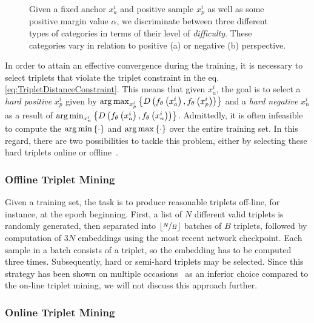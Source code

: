 \begin{figure}[t]
\begin{subfigure}[b]{0.35\textwidth}
        \caption[]{}
    \end{subfigure}
    \caption[Triplet loss categories visualization]{Given a fixed anchor $x_a^i$ and positive sample $x_p^i$ as well as some positive margin value $\alpha$, we discriminate between three different types of categories in terms of their level of \emph{difficulty}. These categories vary in relation to positive (a) or negative (b) perspective.}
    \label{fig:PositiveAndNegativeTripletsCategories}
\end{figure}

In order to attain an effective convergence during the training, it is necessary to select triplets that violate the triplet constraint in the eq. \ref{eq:TripletDistanceConstraint}. This means that given $x_a^i$, the goal is to select a \emph{hard positive} $x_p^i$ given by $\operatorname*{arg\,max}_{x_p^i}\left\{ {{D} \left( {f_\theta} \left( x_a^i \right), {f_\theta} \left( x_p^i \right) \right)} \right\}$ and a \emph{hard negative} $x_n^i$ as a result of $\operatorname*{arg\,min}_{x_n^i}\left\{ {{D} \left( {f_\theta} \left( x_a^i \right), {f_\theta} \left( x_n^i \right) \right)} \right\}$. Admittedly, it is often infeasible to compute the $\operatorname*{arg\,min}\left\{ {\cdot} \right\}$ and $\operatorname*{arg\,max}\left\{ {\cdot} \right\}$ over the entire training set. In this regard, there are two possibilities to tackle this problem, either by selecting these hard triplets online or offline~\cite{Schroff2015}.

\subsubsection{Offline Triplet Mining}

Given a training set, the task is to produce reasonable triplets off-line, for instance, at the epoch beginning. First, a list of $N$ different valid triplets is randomly generated, then separated into $\lfloor \nicefrac{N}{B} \rfloor$ batches of $B$ triplets, followed by computation of $3N$ embeddings using the most recent network checkpoint. Each sample in a batch consists of a triplet, so the embedding has to be computed three times. Subsequently, hard or semi-hard triplets may be selected. Since this strategy has been shown on multiple occasions~\cite{Schroff2015, Hermans2017, Kuma2019} as an inferior choice compared to the on-line triplet mining, we will not discuss this approach further.

\subsubsection{Online Triplet Mining}

